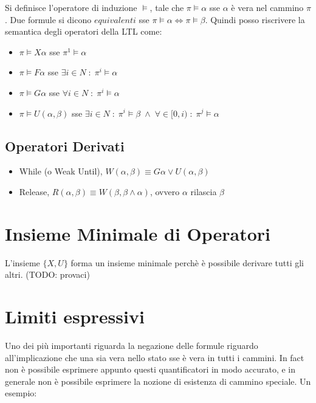 Si definisce l'operatore di induzione $\models$, tale che $\pi \models \alpha$ sse $\alpha$ \`e vera nel cammino $\pi$.
Due formule si dicono $equivalenti$ sse $\pi \models \alpha \Leftrightarrow \pi \models \beta$.
Quindi posso riscrivere la semantica degli operatori della LTL come:

\begin{itemize}
    \item $\pi \models X\alpha$ sse $\pi^{1} \models \alpha$
    \item $\pi \models F\alpha$ sse $\exists i \in N \; : \; \pi^{i} \models \alpha$
    \item $\pi \models G\alpha$ sse $\forall i \in N \; : \; \pi^{i} \models \alpha$
    \item $\pi \models U(\alpha, \beta)$ sse $\exists i \in N \; : \; \pi^{i} \models \beta \; \land \; \forall \in [0, i)\; : \; \pi^{j} \models \alpha$
\end{itemize}

\subsection{Operatori Derivati}

\begin{itemize}
  \item While (o Weak Until), $W(\alpha, \beta) \equiv G\alpha \lor U(\alpha, \beta)$
  \item Release, $R(\alpha, \beta) \equiv W(\beta, \beta \land \alpha)$, ovvero $\alpha$ rilascia $\beta$
\end{itemize}

\section{Insieme Minimale di Operatori}

L'insieme $\{X, U\}$ forma un insieme minimale perch\`e \`e possibile derivare tutti gli altri. (TODO: provaci)

\section{Limiti espressivi}

Uno dei pi\`u importanti riguarda la negazione delle formule riguardo all'implicazione che una sia vera nello stato sse \`e vera in tutti i cammini. In fact non \`e possibile esprimere appunto questi quantificatori in modo accurato, e in generale non \`e possibile esprimere la nozione di esistenza di cammino speciale. Un esempio:

